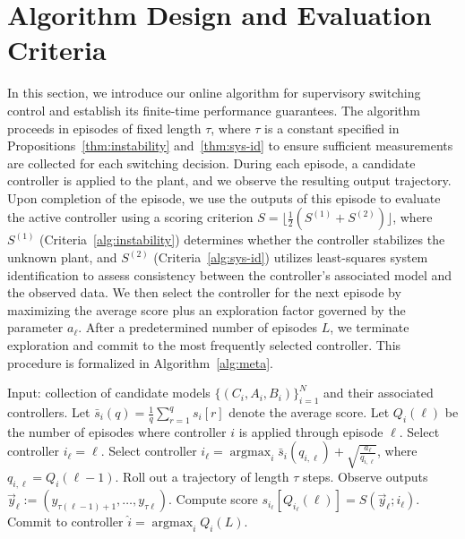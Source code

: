 \documentclass[11pt, twoside]{article}
\theoremstyle{definition}
\newcommand{\argmax}{\mathop{\mathrm{argmax}}}
\begin{document}
\section{Algorithm Design and Evaluation Criteria}
In this section, we introduce our online algorithm for supervisory switching control and establish its finite-time performance guarantees.
The algorithm proceeds in episodes of fixed length $\tau$, where $\tau$ is a constant specified in Propositions~\ref{thm:instability} and~\ref{thm:sys-id} to ensure sufficient measurements are collected for each switching decision.
During each episode, a candidate controller is applied to the plant, and we observe the resulting output trajectory.
Upon completion of the episode, we use the outputs of this episode to evaluate the active controller using a scoring criterion $S = \lfloor \frac{1}{2}(S^{(1)} + S^{(2)}) \rfloor$, where $S^{(1)}$ (Criteria~\ref{alg:instability}) determines whether the controller stabilizes the unknown plant, and $S^{(2)}$ (Criteria~\ref{alg:sys-id}) utilizes least-squares system identification to assess consistency between the controller's associated model and the observed data.
We then select the controller for the next episode by maximizing the average score plus an exploration factor governed by the parameter $a_\ell$. 
After a predetermined number of episodes $L$, we terminate exploration and commit to the most frequently selected controller. This procedure is formalized in Algorithm~\ref{alg:meta}.

\begin{algorithm}
\begin{algorithmic}[1]
    \State Input: collection of candidate models $\{(C_i, A_i, B_i)\}_{i=1}^N$ and their associated controllers.
\State Let $\bar{s}_i(q) = \frac{1}{q} \sum_{r=1}^q s_i[r]$ denote the average score.
    \State Let $Q_i(\ell)$ be the number of episodes where controller $i$ is applied through episode $\ell$.
            Select controller $i_\ell = \ell$.
        \Else
            \State Select controller $i_\ell = \argmax_i \bar{s}_i(q_{i, \ell}) + \sqrt{\frac{a_\ell}{q_{i, \ell}}}$, where $q_{i, \ell} = Q_i(\ell-1)$.
        \EndIf
\State Roll out a trajectory of length $\tau$ steps.
        \State Observe outputs $\vec{y}_\ell := (y_{\tau(\ell-1)+1}, \dots, y_{\tau \ell})$.
        \State Compute score $s_{i_\ell}[Q_{i_\ell}(\ell)] = S(\vec{y}_\ell; i_\ell)$.
    \EndFor
    \State Commit to controller $\hat{i} = \argmax_i Q_i(L)$.
\end{algorithmic}
\caption{Algorithm for supervisory switching control}
\label{alg:meta}
\end{algorithm}
\end{document}
